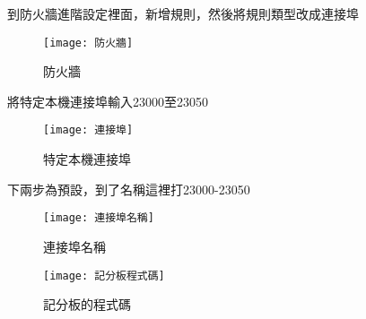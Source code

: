 \begin{center}
到防火牆進階設定裡面，新增規則，然後將規則類型改成連接埠
\end{center}

\begin{figure}[hbt!]
\begin{center}
\texttt{[image: 防火牆]}
\caption{\Large 防火牆}\label{fig.防火牆}
\end{center}
\end{figure}

\begin{center}
將特定本機連接埠輸入23000至23050
\end{center}

\begin{figure}[hbt!]
\begin{center}
\texttt{[image: 連接埠]}
\caption{\Large 特定本機連接埠}\label{fig.連接埠}
\end{center}
\end{figure}

\begin{center}
下兩步為預設，到了名稱這裡打23000-23050
\end{center}

\begin{figure}[hbt!]
\begin{center}
\texttt{[image: 連接埠名稱]}
\caption{\Large 連接埠名稱}\label{fig.連接埠名稱}
\end{center}
\end{figure}

\begin{figure}[hbt!]
\begin{center}
\texttt{[image: 記分板程式碼]}
\caption{\Large 記分板的程式碼}\label{fig.記分板程式碼}
\end{center}
\end{figure}
\newpage